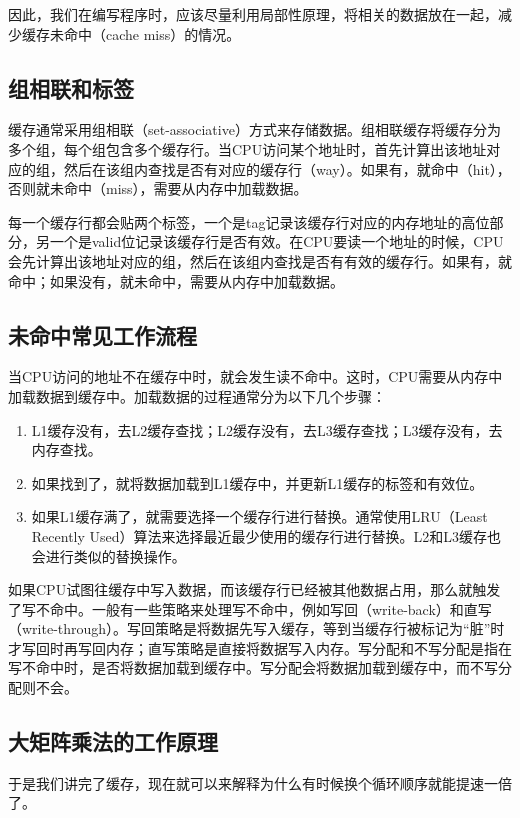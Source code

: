 因此，我们在编写程序时，应该尽量利用局部性原理，将相关的数据放在一起，减少缓存未命中（cache miss）的情况。

\subsection{组相联和标签}

缓存通常采用组相联（set-associative）方式来存储数据。组相联缓存将缓存分为多个组，每个组包含多个缓存行。当CPU访问某个地址时，首先计算出该地址对应的组，然后在该组内查找是否有对应的缓存行（way）。如果有，就命中（hit），否则就未命中（miss），需要从内存中加载数据。

每一个缓存行都会贴两个标签，一个是tag记录该缓存行对应的内存地址的高位部分，另一个是valid位记录该缓存行是否有效。在CPU要读一个地址的时候，CPU会先计算出该地址对应的组，然后在该组内查找是否有有效的缓存行。如果有，就命中；如果没有，就未命中，需要从内存中加载数据。

\subsection{未命中常见工作流程}

当CPU访问的地址不在缓存中时，就会发生读不命中。这时，CPU需要从内存中加载数据到缓存中。加载数据的过程通常分为以下几个步骤：
\begin{enumerate}
  \item L1缓存没有，去L2缓存查找；L2缓存没有，去L3缓存查找；L3缓存没有，去内存查找。
  \item 如果找到了，就将数据加载到L1缓存中，并更新L1缓存的标签和有效位。
  \item 如果L1缓存满了，就需要选择一个缓存行进行替换。通常使用LRU（Least Recently Used）算法来选择最近最少使用的缓存行进行替换。L2和L3缓存也会进行类似的替换操作。
\end{enumerate}

如果CPU试图往缓存中写入数据，而该缓存行已经被其他数据占用，那么就触发了写不命中。一般有一些策略来处理写不命中，例如写回（write-back）和直写（write-through）。写回策略是将数据先写入缓存，等到当缓存行被标记为“脏”时才写回时再写回内存；直写策略是直接将数据写入内存。写分配和不写分配是指在写不命中时，是否将数据加载到缓存中。写分配会将数据加载到缓存中，而不写分配则不会。

\subsection{大矩阵乘法的工作原理}
于是我们讲完了缓存，现在就可以来解释为什么有时候换个循环顺序就能提速一倍了。

